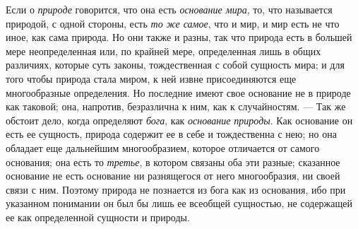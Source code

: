 Если о {\em природе} говорится, что она есть
{\em основание мира}, то, что называется природой, с
одной стороны, есть {\em то же самое}, что и мир, и мир
есть не что иное, как сама природа. Но они также и разны, так что природа
есть в большей мере неопределенная или, по крайней мере, определенная лишь
в общих различиях, которые суть законы, тождественная с собой сущность
мира; и для того чтобы природа стала миром, к ней извне присоединяются еще
многообразные определения. Но последние имеют свое основание не в природе
как таковой; она, напротив, безразлична к ним, как к случайностям. — Так же
обстоит дело, когда определяют {\em бога}, как
{\em основание природы}. Как основание он есть ее
сущность, природа содержит ее в себе и тождественна с нею; но она обладает
еще дальнейшим многообразием, которое отличается от самого основания; она
есть то {\em третье}, в котором связаны оба эти разные;
сказанное основание не есть основание ни разнящегося от него многообразия,
ни своей связи с ним. Поэтому природа не познается из бога как из
основания, ибо при указанном понимании он был бы лишь ее всеобщей
сущностью, не содержащей ее как определенной сущности и природы.

